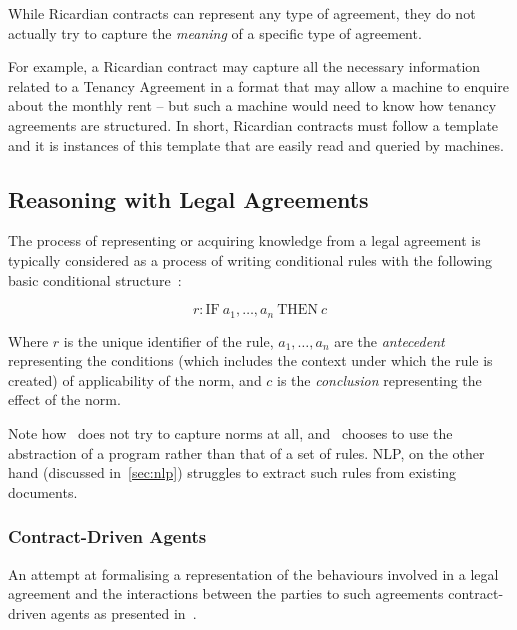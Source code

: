 While Ricardian contracts can represent any type of agreement, they do not actually try to capture the \emph{meaning} of a specific type of agreement.

For example, a Ricardian contract may capture all the necessary information related to a Tenancy Agreement in a format that may allow a machine to enquire about the monthly rent -- but such a machine would need to know how tenancy agreements are structured.
In short, Ricardian contracts must follow a template and it is instances of this template that are easily read and queried by machines.

\subsection{Reasoning with Legal Agreements}\label{subsec:reasoning-with-legal-agreements}

The process of representing or acquiring knowledge from a legal agreement is typically considered as a process of writing conditional rules with the following basic conditional structure~\cite{sartorLegalReasoning, ferraroLegalNLPSSurvey}:

\begin{equation}
    \label{eq:basic-rule}
    r: \text{IF} \  a_{1}, \dots ,a_n \ \text{THEN} \ c
\end{equation}

Where $r$ is the unique identifier of the rule, $a_1, \dots, a_n $ are the \emph{antecedent} representing the conditions (which includes the context under which the rule is created) of applicability of the norm, and $c$ is the \emph{conclusion} representing the effect of the norm.

Note how~ does not try to capture norms at all, and~ chooses to use the abstraction of a program rather than that of a set of rules.
NLP, on the other hand (discussed in~\autoref{sec:nlp}) struggles to extract such rules from existing documents.

\subsubsection{Contract-Driven Agents}\label{subsubsec:contract-driven-agents}

An attempt at formalising a representation of the behaviours involved in a legal agreement and the interactions between the parties to such agreements contract-driven agents as presented in~\cite{knottenbeltContractDriven}.

